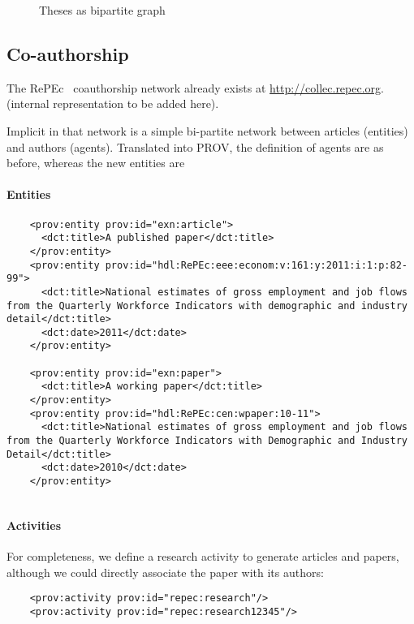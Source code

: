 \documentclass[x11names]{article}
\newcommand{\repec}{RePEc}
\begin{document}
\begin{figure}
\caption{Theses as bipartite graph}\label{fig:thesis:bipartite}

\end{figure}


\subsection{Co-authorship}
The \repec~ coauthorship network already exists at \url{http://collec.repec.org}. (internal representation to be added here).

Implicit in that network is a simple bi-partite network between articles (entities) and authors (agents). Translated into PROV, the definition of agents are as before, whereas the new entities are
\paragraph{Entities}
\begin{lstlisting}
    <prov:entity prov:id="exn:article">
      <dct:title>A published paper</dct:title>
    </prov:entity>
    <prov:entity prov:id="hdl:RePEc:eee:econom:v:161:y:2011:i:1:p:82-99">
      <dct:title>National estimates of gross employment and job flows from the Quarterly Workforce Indicators with demographic and industry detail</dct:title>
      <dct:date>2011</dct:date>
    </prov:entity>

    <prov:entity prov:id="exn:paper">
      <dct:title>A working paper</dct:title>
    </prov:entity>
    <prov:entity prov:id="hdl:RePEc:cen:wpaper:10-11">
      <dct:title>National estimates of gross employment and job flows from the Quarterly Workforce Indicators with Demographic and Industry Detail</dct:title>
      <dct:date>2010</dct:date>
    </prov:entity>
    
\end{lstlisting}
\paragraph{Activities}
For completeness, we define a research activity to generate articles and papers, although we could directly associate the paper with its authors:
\begin{lstlisting}
    <prov:activity prov:id="repec:research"/>
    <prov:activity prov:id="repec:research12345"/>
\end{lstlisting}
\end{document}
